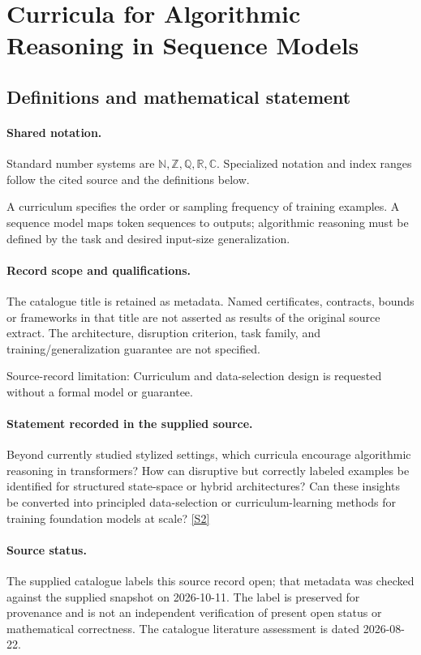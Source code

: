\documentclass[11pt]{article}
\newcommand{\sref}[2]{\hyperlink{source:#1:#2}{[S#2]}}
\begin{document}
\section{Curricula for Algorithmic Reasoning in Sequence Models}\label{statement}

\subsection{Definitions and mathematical statement}

\paragraph{Shared notation.}Standard number systems are $\mathbb N,\mathbb Z,\mathbb Q,\mathbb R,\mathbb C$. Specialized notation and index ranges follow the cited source and the definitions below.


A curriculum specifies the order or sampling frequency of training examples. A sequence model maps token sequences to outputs; algorithmic reasoning must be defined by the task and desired input-size generalization.
\paragraph{Record scope and qualifications.}
The catalogue title is retained as metadata. Named certificates, contracts, bounds or frameworks in that title are not asserted as results of the original source extract.
The architecture, disruption criterion, task family, and training/generalization guarantee are not specified.

Source-record limitation: Curriculum and data-selection design is requested without a formal model or guarantee.
\paragraph{Statement recorded in the supplied source.}
Beyond currently studied stylized settings, which curricula encourage algorithmic reasoning in transformers? How can disruptive but correctly labeled examples be identified for structured state-space or hybrid architectures? Can these insights be converted into principled data-selection or curriculum-learning methods for training foundation models at scale? \sref{statement}{2}
\paragraph{Source status.}
The supplied catalogue labels this source record open; that metadata was checked against the supplied snapshot on 2026-10-11. The label is preserved for provenance and is not an independent verification of present open status or mathematical correctness. The catalogue literature assessment is dated 2026-08-22.
\end{document}
